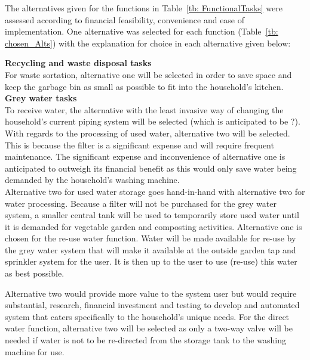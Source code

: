 \documentclass[a4paper,11pt,fleqn]{report}
\begin{document}
{The alternatives given for the functions in Table~\ref{tb: FunctionalTasks} were assessed according to financial feasibility, convenience and ease of implementation. One alternative was selected for each function (Table~\ref{tb: chosen_Alts}) with the explanation for choice in each alternative given below:

\textbf{Recycling and waste disposal tasks}\\
For waste sortation, alternative one will be selected in order to save space and keep the garbage bin as small as possible to fit into the household's kitchen.\\

\textbf{Grey water tasks}\\
To receive water, the alternative with the least invasive way of changing the household's current piping system will be selected (which is anticipated to be ?). With regards to the processing of used water, alternative two will be selected. This is because the filter is a significant expense and will require frequent maintenance. The significant expense and inconvenience of alternative one is anticipated to outweigh its financial benefit as this would only save water being demanded by the household's washing machine.\\

Alternative two for used water storage goes hand-in-hand with alternative two for water processing. Because a filter will not be purchased for the grey water system, a smaller central tank will be used to temporarily store used water until it is demanded for vegetable garden and composting activities. Alternative one is chosen for the re-use water function. Water will be made available for re-use by the grey water system that will make it available at the outside garden tap and sprinkler system for the user. It is then up to the user to use (re-use) this water as best possible.

Alternative two would provide more value to the system user but would require substantial, research, financial investment and testing to develop and automated system that caters specifically to the household's unique needs. For the direct water function, alternative two will be selected as only a two-way valve will be needed if water is not to be re-directed from the storage tank to the washing machine for use.\\

}
\end{document}
